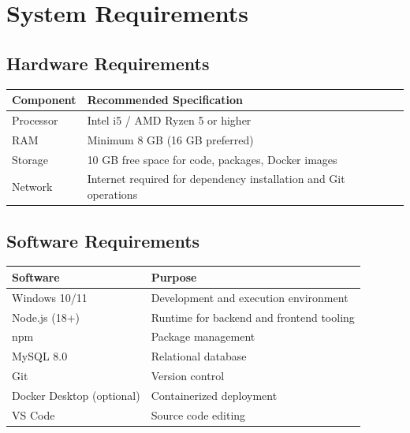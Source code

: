 ﻿\chapter{System Requirements}

\section{Hardware Requirements}
\begin{table}[H]
\centering
\begin{tabular}{p{5cm}p{9cm}}
\toprule
\textbf{Component} & \textbf{Recommended Specification} \\
\midrule
Processor & Intel i5 / AMD Ryzen 5 or higher \\
RAM & Minimum 8 GB (16 GB preferred) \\
Storage & 10 GB free space for code, packages, Docker images \\
Network & Internet required for dependency installation and Git operations \\
\bottomrule
\end{tabular}
\end{table}

\section{Software Requirements}
\begin{table}[H]
\centering
\begin{tabular}{p{5cm}p{9cm}}
\toprule
\textbf{Software} & \textbf{Purpose} \\
\midrule
Windows 10/11 & Development and execution environment \\
Node.js (18+) & Runtime for backend and frontend tooling \\
npm & Package management \\
MySQL 8.0 & Relational database \\
Git & Version control \\
Docker Desktop (optional) & Containerized deployment \\
VS Code & Source code editing \\
\bottomrule
\end{tabular}
\end{table}
